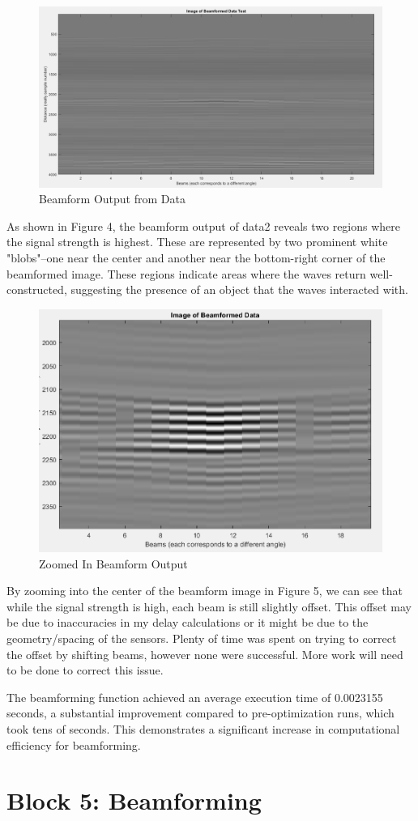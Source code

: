 \begin{figure}[H]
    \centering
    \includegraphics[width=0.5\linewidth]{figures/beamform_fig4.png}
    \caption{Beamform Output from Data}
    \label{fig:final_beamform_output}
\end{figure}

As shown in Figure 4, the beamform output of data2 reveals two regions where the signal strength is highest. These are represented by two prominent white "blobs"--one near the center and another near the bottom-right corner of the beamformed image. These regions indicate areas where the waves return well-constructed, suggesting the presence of an object that the waves interacted with.

\begin{figure}[H]
    \centering
    \includegraphics[width=0.5\linewidth]{figures/beamform_fig5.png}
    \caption{Zoomed In Beamform Output}
    \label{fig:zoomed_in_beamform_output}
\end{figure}

By zooming into the center of the beamform image in Figure 5, we can see that while the signal strength is high, each beam is still slightly offset. This offset may be due to inaccuracies in my delay calculations or it might be due to the geometry/spacing of the sensors. Plenty of time was spent on trying to correct the offset by shifting beams, however none were successful. More work will need to be done to correct this issue.


The beamforming function achieved an average execution time of 0.0023155 seconds, a substantial improvement compared to pre-optimization runs, which took tens of seconds. This demonstrates a significant increase in computational efficiency for beamforming.


\section{Block 5: Beamforming}